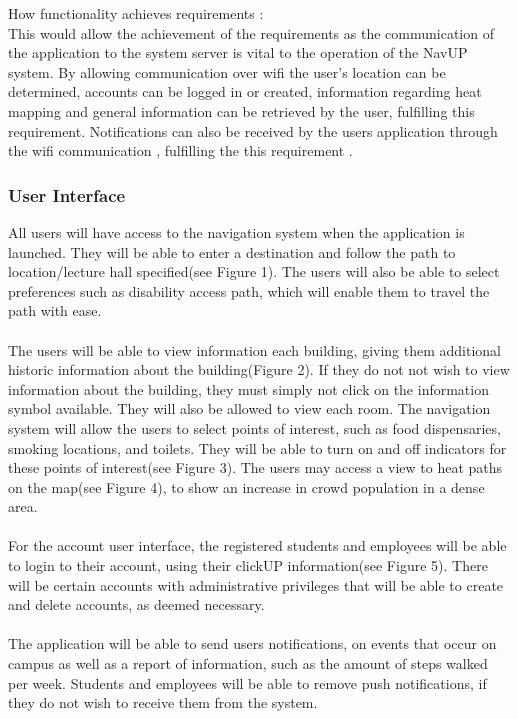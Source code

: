 \documentclass{article}
\begin{document}
{How functionality achieves requirements :\\
This would allow the achievement of the requirements as the communication of the application to the system server is vital to the operation of the NavUP system. By allowing communication over wifi the user's location can be determined, accounts can be logged in or created, information regarding heat mapping and general information can be retrieved by the user, fulfilling this requirement. Notifications can also be received by the users application through the wifi communication , fulfilling the this requirement .}
		
            \subsubsection{User Interface}
	    {All users will have access to the navigation system when the application is launched.
They will be able to enter a destination and follow the path to location/lecture hall specified(see Figure 1).
The users will also be able to select preferences such as disability access path, which will enable them to travel the path with ease.\\\\
The users will be able to view information each building, giving them additional historic information about the building(Figure 2). If they do not not wish to 
view information about the building, they must simply not click on the information symbol available.
They will also be allowed to view each room. The navigation system will allow the users to select points of interest, such as food dispensaries, 
smoking locations, and toilets. They will be able to turn on and off indicators for these points of interest(see Figure 3).
The users may access a view to heat paths on the map(see Figure 4), to show an increase in crowd population in a dense area.\\\\
For the account user interface, the registered students and employees will be able to login to their account, using their clickUP information(see Figure 5).
There will be certain accounts with administrative privileges that will be able to create and delete accounts, as deemed necessary.\\\\
The application will be able to send users notifications, on events that occur on campus as well as a report of information, such as the amount of 
steps walked per week. Students and employees will be able to remove push notifications, if they do not wish to receive them from the system.\\\\
}
\end{document}
